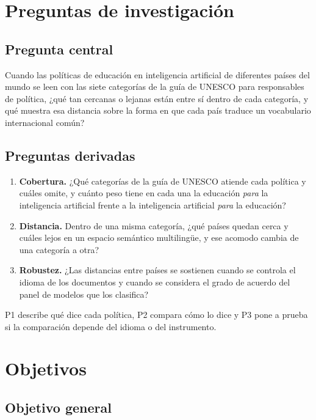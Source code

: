 \section{Preguntas de investigación}
\label{sec:preguntas}

\subsection{Pregunta central}

Cuando las políticas de educación en inteligencia artificial de diferentes países del mundo se leen con las
siete categorías de la guía de UNESCO para responsables de política, ¿qué tan cercanas o
lejanas están entre sí dentro de cada categoría, y qué muestra esa distancia sobre la forma
en que cada país traduce un vocabulario internacional común?

\subsection{Preguntas derivadas}

\begin{enumerate}
  \item[\textbf{P1.}] \textbf{Cobertura.} ¿Qué categorías de la guía de UNESCO atiende cada
  política y cuáles omite, y cuánto peso tiene en cada una la educación \textit{para} la
  inteligencia artificial frente a la inteligencia artificial \textit{para} la educación?

  \item[\textbf{P2.}] \textbf{Distancia.} Dentro de una misma categoría, ¿qué países quedan
  cerca y cuáles lejos en un espacio semántico multilingüe, y ese acomodo cambia de una
  categoría a otra?

  \item[\textbf{P3.}] \textbf{Robustez.} ¿Las distancias entre países se sostienen cuando se
  controla el idioma de los documentos y cuando se considera el grado de acuerdo del panel de
  modelos que los clasifica?
\end{enumerate}

P1 describe qué dice cada política, P2 compara cómo lo dice y P3 pone a prueba si la
comparación depende del idioma o del instrumento.

\section{Objetivos}
\label{sec:objetivos}

\subsection{Objetivo general}

